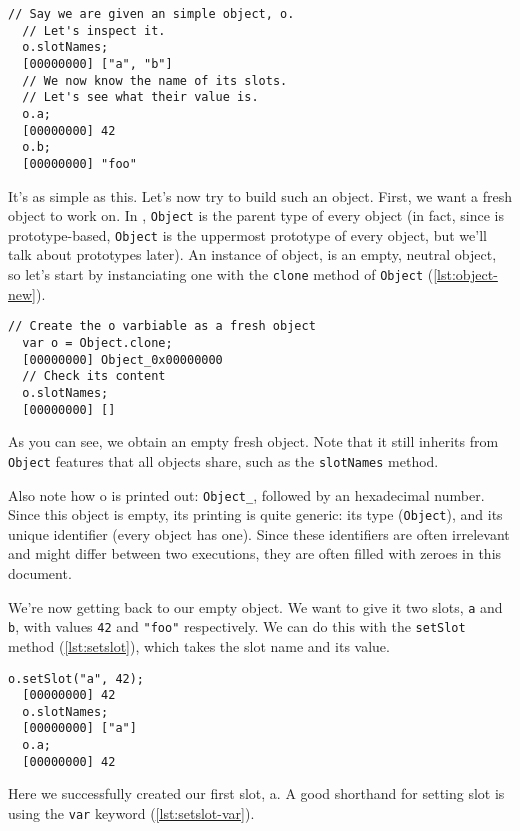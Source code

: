 \documentclass[openright,twoside,12pt]{report}
\begin{document}
\begin{lstlisting}[caption=Inspecting an \urbi
  object,label=lst:object-slots]
  // Say we are given an simple object, o.
  // Let's inspect it.
  o.slotNames;
  [00000000] ["a", "b"]
  // We now know the name of its slots.
  // Let's see what their value is.
  o.a;
  [00000000] 42
  o.b;
  [00000000] "foo"
\end{lstlisting}

It's as simple as this. Let's now try to build such an object. First,
we want a fresh object to work on. In \urbi, \texttt{Object} is the
parent type of every object (in fact, since \urbi is prototype-based,
\texttt{Object} is the uppermost prototype of every object, but we'll
talk about prototypes later). An instance of object, is an empty,
neutral object, so let's start by instanciating one with the
\texttt{clone} method of \texttt{Object} (\autoref{lst:object-new}).

\begin{lstlisting}[caption=Instanciating a new object,
  label=lst:object-new]
  // Create the o varbiable as a fresh object
  var o = Object.clone;
  [00000000] Object_0x00000000
  // Check its content
  o.slotNames;
  [00000000] []
\end{lstlisting}

As you can see, we obtain an empty fresh object. Note that it still
inherits from \texttt{Object} features that all objects share, such as
the \texttt{slotNames} method.

Also note how o is printed out: \texttt{Object\_}, followed by an
hexadecimal number. Since this object is empty, its printing is quite
generic: its type (\texttt{Object}), and its unique identifier (every
\urbi object has one). Since these identifiers are often irrelevant
and might differ between two executions, they are often filled with
zeroes in this document.

We're now getting back to our empty object. We want to give it two
slots, \texttt{a} and \texttt{b}, with values \lstinline|42| and
\lstinline|"foo"| respectively. We can do this with the
\texttt{setSlot} method (\autoref{lst:setslot}), which takes the slot name and
its value.

\begin{lstlisting}[caption=Defining slots, label=lst:setslot]
  o.setSlot("a", 42);
  [00000000] 42
  o.slotNames;
  [00000000] ["a"]
  o.a;
  [00000000] 42
\end{lstlisting}

Here we successfully created our first slot, a. A good shorthand for
setting slot is using the \texttt{var} keyword (\autoref{lst:setslot-var}).
\end{document}
